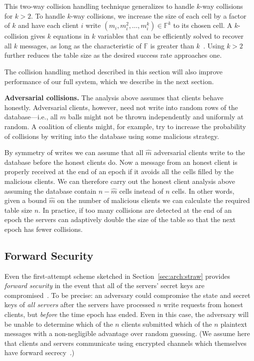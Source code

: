 \documentclass[10pt,twocolumn]{article}
\newcommand{\F}{\mathbb{F}}
\newcommand{\nicepara}[1]{\medskip\noindent\textbf{#1.}}
\begin{document}
\medskip
This two-way collision handling technique generalizes to handle
$k$-way collisions for $k>2$.
To handle $k$-way collisions, we increase the size of each cell by a
factor of $k$ and have each client $i$ write $(m_i, m_i^2, \ldots,
m_i^k) \in \F^k$ to its chosen cell.  A $k$-collision gives $k$
equations in $k$ variables that can be efficiently solved to recover
all $k$ messages, as long as the characteristic of $\F$ is greater
than $k$~\cite{bos1989detection,chien1966application}.
Using $k>2$ further reduces the table size as the
desired success rate approaches one.

The collision handling method described in this section will also
improve performance of our full system, which we describe in the next section.


\nicepara{Adversarial collisions} The analysis above assumes that
clients behave honestly.  Adversarial clients, however,
need not write into random rows of the database---i.e.,
all $m$ balls might not be thrown independently and uniformly at
random.  A coalition of clients might, for example, try to increase the
probability of collisions by writing into the database using some
malicious strategy.

By symmetry of writes we can assume that all $\hat{m}$ adversarial
clients write to the database before the honest clients do.  
Now a message from an honest client is properly received at the end of an
epoch if it avoids all the cells filled by the malicious
clients.  We can therefore carry out the honest client analysis above
assuming the database contain $n-\hat{m}$ cells instead of $n$ cells.
In other words, given a bound $\hat{m}$ on the number of malicious
clients we can calculate the required table size $n$.  In practice, if
too many collisions are detected at the end of an epoch the servers can
adaptively double the size of the table so that the next epoch has
fewer collisions. 


 


\subsection{Forward Security}
\label{sec:arch:forward}

Even the first-attempt scheme
sketched in Section~\ref{sec:arch:straw} provides
{\em forward security} in the event that all
of the servers' secret keys are compromised~\cite{canetti2003forward}.
To be precise: an adversary could compromise the
state and secret keys of {\em all servers} after the servers
have processed $n$ write requests from honest clients, 
but {\em before} the time epoch has ended.
Even in this case, 
the adversary will be unable to determine which of the
$n$ clients submitted which of the $n$ plaintext
messages with a non-negligible advantage over random guessing.
(We assume here that clients and servers
communicate using encrypted channels which themselves
have forward secrecy~\cite{rfc7296}.)
\end{document}
